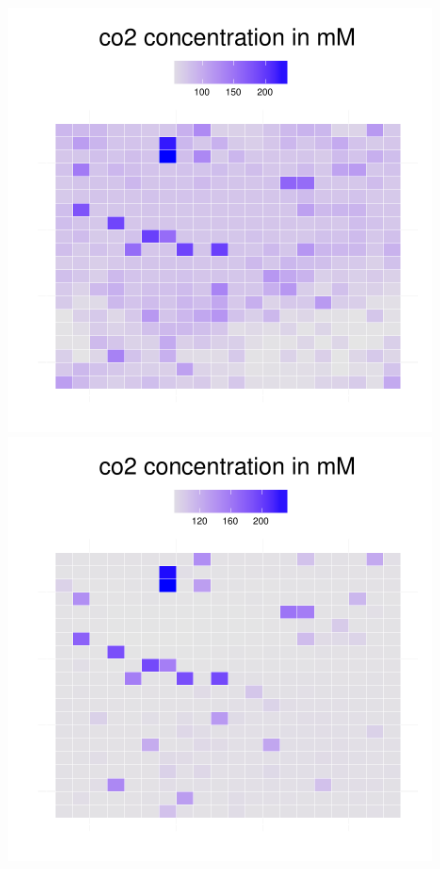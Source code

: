 \begin{figure}[h!]
{\begin{minipage}[t]{0.3\textwidth}
  \end{minipage}
  \begin{minipage}[t]{0.3\textwidth}
    \includegraphics[width=\textwidth]{../results/beijerinckii_20x20_seed943_co250.pdf}
  \end{minipage}
  \begin{minipage}[t]{0.3\textwidth}
    \includegraphics[width=\textwidth]{../results/beijerinckii_20x20_seed943_co265.pdf}

\end{minipage}}
\end{figure}

